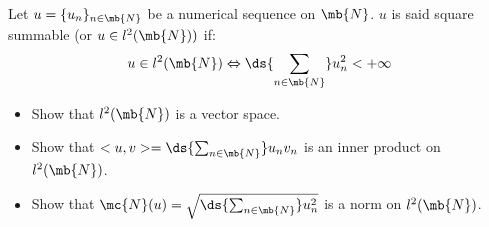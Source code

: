 \bexo
Let $u=\{u_n\}_{n\in\mb{N}}$ be a numerical sequence on $\mb{N}$. $u$ is said square summable  (or $u\in l^2(\mb{N}))$ if: 
\begin{equation*}
u\in l^2(\mb{N}) \Leftrightarrow \ds{\sum_{n\in\mb{N}}} u_n^2<+\infty
\end{equation*}


\begin{itemize}
\item Show that $l^2(\mb{N})$ is a vector space.
\item Show that  $<u,v>=\ds{\sum_{n\in\mb{N}}} u_nv_n$ is an inner product on $l^2(\mb{N})$.
\item Show that $\mc{N}(u)=\sqrt{\ds{\sum_{n\in\mb{N}}} u_n^2}$ is a norm on $l^2(\mb{N})$.
\end{itemize}

 
\eexo
\solution{
 

}